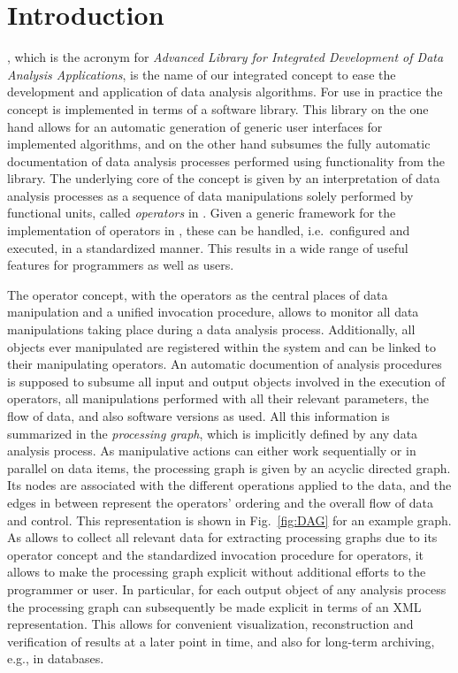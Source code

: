 \section{Introduction}

\label{sec:intro}
\alida, which is the acronym for {\it Advanced Library for Integrated Development of Data Analysis Applications}, 
is the name of our integrated concept to ease the development and application of data analysis algorithms. 
For use in practice the concept is implemented in terms of a software library. 
This \alida library on the one hand allows for an automatic generation of
generic user interfaces for implemented algorithms, and on the other hand
subsumes the fully automatic documentation of data analysis processes performed
using functionality from the library.
The underlying core of the \alida concept is given by an interpretation of data
analysis processes as a sequence of data manipulations solely performed by
functional units, called {\em operators} in \alida. 
Given a generic framework for the implementation of operators in \alida, these
can be handled, i.e.~configured and executed, in a standardized manner.
This results in a wide range of useful features for programmers as well as users.

The operator concept, with the operators as the central places of data
manipulation and a unified invocation procedure, allows to monitor all data
manipulations taking place during a data analysis process. Additionally, all
objects ever manipulated are registered within the system and can be linked to
their manipulating operators.
An automatic documention of analysis procedures is supposed to subsume all
input and output objects involved in the execution of operators, all
manipulations performed with all their relevant parameters, the flow of data,
and also software versions as used. All this information is summarized in
the {\em processing graph}, which is implicitly defined by any data
analysis process. 
As manipulative actions can either work sequentially or in parallel on
data items, the processing graph is given by an acyclic directed graph.
Its nodes are associated with the different operations applied to the data, and
the edges in between represent the operators' ordering and the overall flow of
data and control. This representation is shown in Fig.~\ref{fig:DAG} for an
example graph.
As \alida allows to collect all relevant data for extracting processing
graphs due to its operator concept and the standardized invocation procedure for
operators, it allows to make the processing graph explicit without
additional efforts to the programmer or user.
In particular, for each output object of any analysis process the processing
graph can subsequently be made explicit in terms of an XML representation. 
This allows for convenient visualization, reconstruction and verification of 
results at a later point in time, and also for long-term archiving, e.g., 
in databases.

